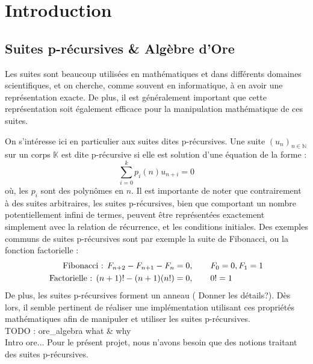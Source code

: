\documentclass[12pt]{article}
\begin{document}

\setcounter{tocdepth}{2}

\newpage
\tableofcontents
\newpage

\section{Introduction}
    \subsection{Suites p-récursives \& Algèbre d'Ore}
        \label{sec:prec}
        \par Les suites sont beaucoup utilisées en mathématiques et dans différents domaines
        scientifiques, et on cherche, comme souvent en informatique, à en avoir une
        représentation exacte. De plus, il est généralement important que cette représentation
        soit également efficace pour la manipulation mathématique de ces suites.
        \par On s'intéresse ici en particulier aux suites dites p-récursives.
        Une suite $(u_n)_{n\in\mathbb N}$ sur un corps $\mathbb K$ est dite p-récursive
        si elle est solution d'une équation de la forme :
        \begin{equation}
            \sum_{i=0}^k p_i(n) u_{n+i} = 0
        \end{equation}
        où, les $p_i$ sont des polynômes en $n$. Il est importante de noter que contrairement
        à des suites arbitraires, les suites p-récursives, bien que comportant un nombre
        potentiellement infini de termes, peuvent être représentées exactement simplement
        avec la relation de récurrence, et les conditions initiales.
        Des exemples communs de suites p-récursives
        sont par exemple la suite de Fibonacci, ou la fonction factorielle :
        \begin{align*}
            \textnormal{Fibonacci : } F_{n+2} - F_{n+1} - F_n &= 0, \qquad F_0=0, F_1=1\\
            \textnormal{Factorielle : } (n+1)! - (n+1)(n!) &= 0, \qquad 0!=1
        \end{align*}
        De plus, les suites p-récursives forment un anneau ({\color{red} Donner les détails?}).
        Dès lors, il semble pertinent
        de réaliser une implémentation utilisant ces propriétés mathématiques afin de
        manipuler et utiliser les suites p-récursives.\\
        {\color{red} TODO : ore\_algebra what \& why\\ Intro ore...} Pour le présent projet,
        nous n'avons besoin que des notions traitant des suites p-récursives.
\end{document}
